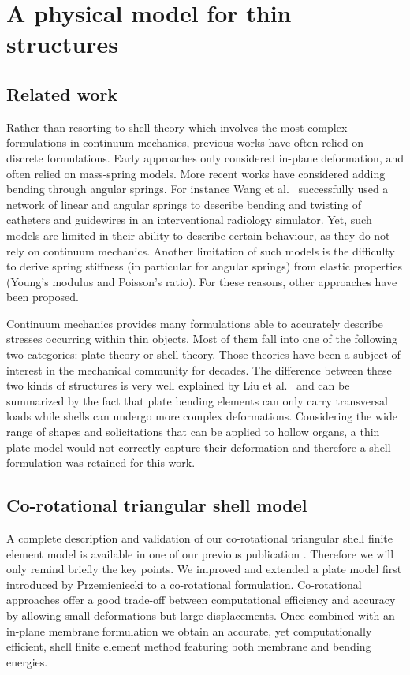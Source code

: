 \documentclass{llncs}
\newcommand{\CD}[1]{{\color{magenta}{\textbf{CD: #1}}}}
\begin{document}
\section{A physical model for thin structures}
\label{sec:model}
\subsection{Related work}  

Rather than resorting to shell theory which involves the most complex formulations in continuum mechanics, previous works have often relied on discrete formulations. Early approaches only considered in-plane deformation, and often relied on mass-spring models. More recent works have considered adding bending through angular springs. For instance Wang et al.~\cite{Wang07} successfully used a network of linear and angular springs to describe bending and twisting of catheters and guidewires in an interventional radiology simulator. \CD{C'est pas des shells si?} Yet, such models are limited in their ability to describe certain behaviour, as they do not rely on continuum mechanics. Another limitation of such models is the difficulty to derive spring stiffness (in particular for angular springs) from elastic properties (Young's modulus and Poisson's ratio). For these reasons, other approaches have been proposed. 

Continuum mechanics provides many formulations able to accurately describe stresses occurring within thin objects. Most of them fall into one of the following two categories: plate theory or shell theory. Those theories have been a subject of interest in the mechanical community for decades. The difference between these two kinds of structures is very well explained by Liu et al.~\cite{Liu03} and can be summarized by the fact that plate bending elements can only carry transversal loads while shells can undergo more complex deformations. Considering the wide range of shapes and solicitations that can be applied to hollow organs, a thin plate model would not correctly capture their deformation and therefore a shell formulation was retained for this work.


\subsection{Co-rotational triangular shell model}

A complete description and validation of our co-rotational triangular shell finite element model is available in one of our previous publication \cite{Comas2010ISBMS}. Therefore we will only remind briefly the key points. We improved and extended a plate model first introduced by Przemieniecki \cite{Przemieniecki68} to a co-rotational formulation. Co-rotational approaches offer a good trade-off between computational efficiency and accuracy by allowing small deformations but large displacements. Once combined with an in-plane membrane formulation we obtain an accurate, yet computationally efficient, shell finite element method featuring both membrane and bending energies. 
\end{document}
